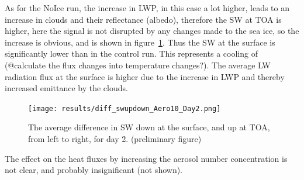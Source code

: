  As for the NoIce run, the increase in LWP, in this case a lot higher, leads to an increase in clouds and their reflectance (albedo), therefore the SW at TOA is higher, here the signal is not disrupted by any changes made to the sea ice, so the increase is obvious, and is shown in figure~\ref{fig:swup_down_r3Day2}. Thus the SW at the surface is significantly lower than in the control run. This represents a cooling of (@calculate the flux changes into temperature changes?). The average LW radiation flux at the surface is higher due to the increase in LWP and thereby increased emittance by the clouds.%
\begin{figure}
\centering
\texttt{[image: results/diff\_swupdown\_Aero10\_Day2.png]}
\caption{The average difference in SW down at the surface, and up at TOA, from left to right, for day 2. (preliminary figure)}
\label{fig:swup_down_r3Day2}
\end{figure}
The effect on the heat fluxes by increasing the aerosol number concentration is not clear, and probably insignificant (not shown).

